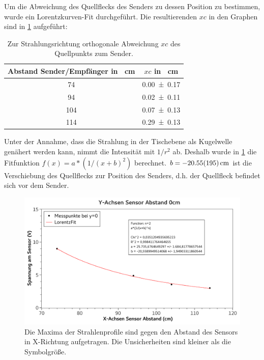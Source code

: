\documentclass[
	a4paper,
	12pt,
	pagesize,
	ngerman
]{scrartcl}
\begin{document}
	Um die Abweichung des Quellflecks des Senders zu dessen Position zu bestimmen, wurde ein Lorentzkurven-Fit durchgeführt. Die resultierenden $xc$ in den Graphen sind in \cref{tab_xc} aufgeführt:
	\begin{table}[H]
		\centering
		\begin{tabular}{ c | c }
			Abstand Sender/Empfänger in \SI{}{cm} & $xc$ in \SI{}{cm}  \\ \hline
			\SI{74}{}&\SI{0,00+-0,17}{}\\
			\SI{94}{}&\SI{0,02+-0,11}{}\\
			\SI{104}{}&\SI{0,07+-0,13}{}\\
			\SI{114}{}&\SI{0,29+-0,13}{}\\
		\end{tabular}
		\caption{Zur Strahlungsrichtung orthogonale Abweichung $xc$ des Quellpunkts zum Sender.}
		\label{tab_xc} 
	\end{table}
	Unter der Annahme, dass die Strahlung in der Tischebene als Kugelwelle genähert werden kann, nimmt die Intensität mit $1/r^2$ ab. 
	Deshalb wurde in \cref{fig_y0cm} die Fitfunktion $f(x)=a*(1/(x+b)^2)$ berechnet. $b=\SI{-20,55+-1,95}{cm}$ ist die Verschiebung des Quellflecks zur Position des Senders, d.h. der Quellfleck befindet sich vor dem Sender. %
	\begin{figure}[H]
		\includegraphics[width=1\textwidth]{fig_y0cm}
		\centering
		\caption{Die Maxima der Strahlenprofile sind gegen den Abstand des Sensors in X-Richtung aufgetragen. Die Unsicherheiten sind kleiner als die Symbolgröße.}
		\label{fig_y0cm}
		\centering
	\end{figure}
	
\end{document}
